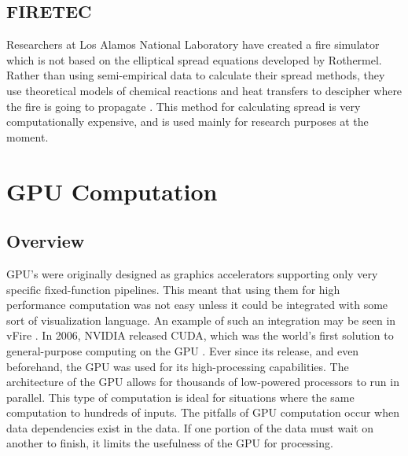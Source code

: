 \subsection{FIRETEC}
Researchers at Los Alamos National Laboratory have created a fire simulator which is not based on the elliptical spread equations developed by Rothermel. Rather than using semi-empirical data to calculate their spread methods, they use theoretical models of chemical reactions and heat transfers to descipher where the fire is going to propagate \cite{firetech}. This method for calculating spread is very computationally expensive, and is used mainly for research purposes at the moment. 

\section{GPU Computation}
\subsection{Overview}
GPU's were originally designed as graphics accelerators supporting only very specific fixed-function pipelines. This meant that using them for high performance computation was not easy unless it could be integrated with some sort of visualization language. An example of such an integration may be seen in vFire \cite{vFire}. In 2006, NVIDIA released CUDA, which was the world's first solution to general-purpose computing on the GPU \cite{cuda}. Ever since its release, and even beforehand, the GPU was used for its high-processing capabilities. The architecture of the GPU allows for thousands of low-powered processors to run in parallel. This type of computation is ideal for situations where the same computation to hundreds of inputs. The pitfalls of GPU computation occur when data dependencies exist in the data. If one portion of the data must wait on another to finish, it limits the usefulness of the GPU for processing. 

